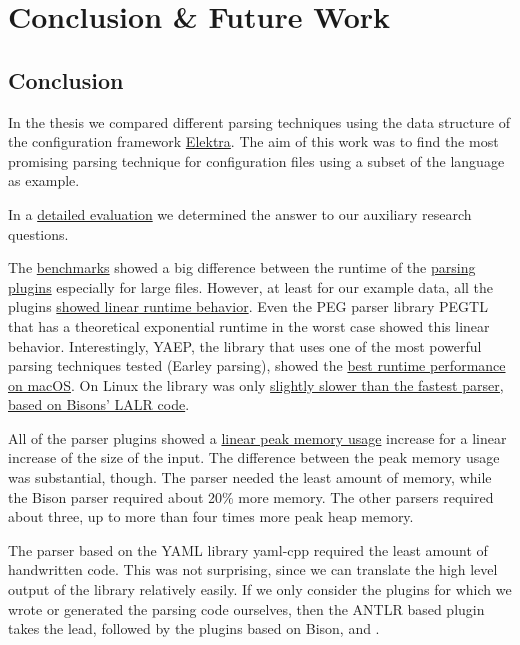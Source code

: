 \chapter{Conclusion \& Future Work}
\label{sec:conclusion_and_future_work}

\section{Conclusion}

In the thesis we compared different parsing techniques using the  data structure of the configuration framework \href{https://www.libelektra.org}{Elektra}. The aim of this work was to find the most promising parsing technique for configuration files using a subset of the language  as example.

In a \hyperref[sec:evaluation]{detailed evaluation} we determined the answer to our auxiliary research questions.

\speed*

The \hyperref[sec:run_time_performance]{benchmarks} showed a big difference between the runtime of the \hyperref[sec:design_challenges_and_decisions]{parsing plugins} especially for large files. However, at least for our example data, all the plugins \hyperref[fig:benchmark_results_generated_above_1000]{showed linear runtime behavior}. Even the PEG parser library \gls{PEGTL} that has a theoretical exponential runtime in the worst case showed this linear behavior. Interestingly, \gls{YAEP}, the library that uses one of the most powerful parsing techniques tested (Earley parsing), showed the \hyperref[fig:benchmark_generated]{best runtime performance on macOS}. On Linux the library was only \hyperref[fig:benchmark_generated]{slightly slower than the fastest parser, based on Bisons’ LALR code}.

\memory*

All of the parser plugins showed a  \hyperref[fig:benchmark_results_memory_lines_above_thousand]{linear peak memory usage} increase for a linear increase of the size of the input. The difference between the peak memory usage was substantial, though. The  parser needed the least amount of memory, while the Bison parser required about 20\% more memory. The other parsers required about three, up to more than four times more peak heap memory.

\size*

The parser based on the YAML library yaml-cpp required the least amount of handwritten code. This was not surprising, since we can translate the high level output of the library relatively easily. If we only consider the plugins for which we wrote or generated the parsing code ourselves, then the ANTLR based plugin takes the lead, followed by the plugins based on Bison,  and .


